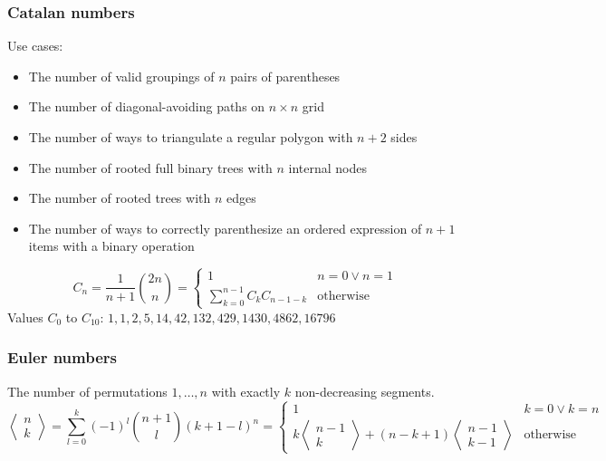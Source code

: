 \subsubsection{Catalan numbers}
Use cases:
\begin{itemize}
\item The number of valid groupings of $n$ pairs of parentheses
\item The number of diagonal-avoiding paths on $n\times n$ grid
\item The number of ways to triangulate a regular polygon with $n + 2$
  sides
\item The number of rooted full binary trees with $n$ internal nodes
\item The number of rooted trees with $n$ edges
\item The number of ways to correctly parenthesize an ordered expression of $n
  + 1$ items with a binary operation
\end{itemize}
\begin{equation*}
  C_n = \frac{1}{n + 1}\binom{2n}{n} =
  \begin{cases}
    1 & n = 0 \lor n = 1\\
    \sum\limits_{k = 0}^{n - 1}C_kC_{n - 1 - k} & \text{otherwise}
  \end{cases}
\end{equation*}
Values $C_0$ to $C_{10}$: $1, 1, 2, 5, 14, 42, 132, 429, 1430, 4862, 16796$

\subsubsection{Euler numbers}

The number of permutations $1,\ldots, n$ with exactly $k$
non-decreasing segments.
\begin{equation*}
  \left\langle
    \begin{matrix}
      n\\k
    \end{matrix}
\right\rangle = \sum\limits_{l = 0}^k(-1)^l \binom{n + 1}{l}(k + 1 - l)^n
  =
  \begin{cases}
    1 & k = 0 \lor k = n\\
    k \left\langle
      \begin{smallmatrix}
        n - 1\\k
      \end{smallmatrix}
\right\rangle + (n - k + 1) \left\langle
  \begin{smallmatrix}
    n - 1\\k - 1
  \end{smallmatrix}
\right\rangle & \text{otherwise}
  \end{cases}
\end{equation*}

